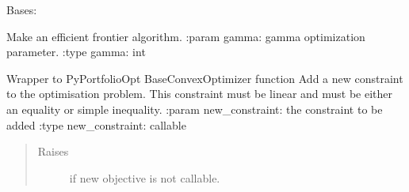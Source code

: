 \documentclass[letterpaper,10pt,english]{sphinxmanual}
\begin{document}

\begin{fulllineitems}
\label{\detokenize{dalio.model:dalio.model.financial.MakeEfficientFrontier}}
Bases: {\hyperref[\detokenize{dalio.model:dalio.model.financial.MakeCriticalLine}]{}}

Make an efficient frontier algorithm.
:param gamma: gamma optimization parameter.
:type gamma: int

\begin{fulllineitems}
\label{\detokenize{dalio.model:dalio.model.financial.MakeEfficientFrontier.add_constraint}}
Wrapper to PyPortfolioOpt BaseConvexOptimizer function
Add a new constraint to the optimisation problem. This constraint must
be linear and must be either an equality or simple inequality.
:param new\_constraint: the constraint to be added
:type new\_constraint: callable
\begin{quote}\begin{description}
\item[{Raises}] \leavevmode
{} \textendash{} if new objective is not callable.

\end{description}\end{quote}

\end{fulllineitems}



\end{fulllineitems}
\end{document}
